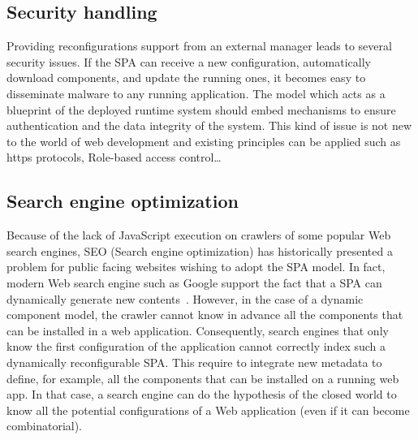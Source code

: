 \subsection{Security handling}
Providing reconfigurations support from an external manager leads to several security issues.
If the SPA can receive a new configuration, automatically download components, and update the running ones, it becomes easy to disseminate malware to any running application.
The model which acts as a blueprint of the deployed runtime system should embed mechanisms to ensure authentication and the data integrity of the system.
This kind of issue is not new to the world of web development and existing principles can be applied such as https protocols, Role-based access control\dots

\subsection{Search engine optimization}
Because of the lack of JavaScript execution on crawlers of some popular Web search engines, SEO (Search engine optimization) has historically presented a problem for public facing websites wishing to adopt the SPA model. In fact, modern Web search engine such as Google support the fact that a SPA can dynamically generate new contents~\cite{googlesearch}. However, in the case of a dynamic component model, the crawler cannot know in advance all the components that can be installed in a web application. Consequently, search engines that only know the first configuration of the application cannot correctly index such a dynamically reconfigurable SPA. This require to integrate new metadata to define, for example, all the components that can be installed on a running web app. In that case, a search engine can do the hypothesis of the closed world to know all the potential configurations of a Web application (even if it can become combinatorial).

